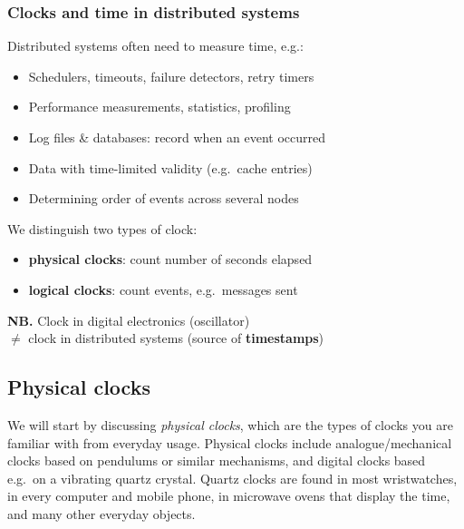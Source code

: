 \begin{frame}
    \label{s:clocks-intro}
    \frametitle{Clocks and time in distributed systems}
    Distributed systems often need to measure time, e.g.:
    \begin{itemize}
        \item Schedulers, timeouts, failure detectors, retry timers\pause
        \item Performance measurements, statistics, profiling\pause
        \item Log files \& databases: record when an event occurred\pause
        \item Data with time-limited validity (e.g.\ cache entries)\pause
        \item Determining order of events across several nodes\\[1em]\pause
    \end{itemize}
    We distinguish two types of clock:
    \begin{itemize}
        \item \textbf{physical clocks}: count number of seconds elapsed
        \item \textbf{logical clocks}: count events, e.g.\ messages sent\\[1em]
    \end{itemize}\pause
    \textbf{NB.} Clock in digital electronics (oscillator)\\$\neq$ clock in distributed systems (source of \textbf{timestamps})
\end{frame}
\label{l:clocks-intro}


\subsection{Physical clocks}\label{sec:physical-clocks}

We will start by discussing \emph{physical clocks}, which are the types of clocks you are familiar with from everyday usage.
Physical clocks include analogue/mechanical clocks based on pendulums or similar mechanisms, and digital clocks based e.g.\ on a vibrating quartz crystal.
Quartz clocks are found in most wristwatches, in every computer and mobile phone, in microwave ovens that display the time, and many other everyday objects.

